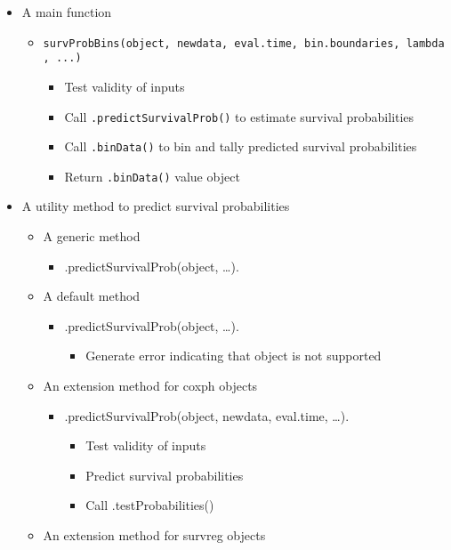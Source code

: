 \documentclass[
]{book}
\providecommand{\tightlist}{%
  \setlength{\itemsep}{0pt}\setlength{\parskip}{0pt}}
\begin{document}
\begin{itemize}
\tightlist
\item
  A main function

  \begin{itemize}
  \tightlist
  \item
    \texttt{survProbBins(object,\ newdata,\ eval.time,\ bin.boundaries,\ lambda,\ ...)}

    \begin{itemize}
    \tightlist
    \item
      Test validity of inputs
    \item
      Call \texttt{.predictSurvivalProb()} to estimate survival probabilities
    \item
      Call \texttt{.binData()} to bin and tally predicted survival probabilities
    \item
      Return \texttt{.binData()} value object
    \end{itemize}
  \end{itemize}
\item
  A utility method to predict survival probabilities

  \begin{itemize}
  \tightlist
  \item
    A generic method

    \begin{itemize}
    \tightlist
    \item
      .predictSurvivalProb(object, \ldots).
    \end{itemize}
  \item
    A default method

    \begin{itemize}
    \tightlist
    \item
      .predictSurvivalProb(object, \ldots).

      \begin{itemize}
      \tightlist
      \item
        Generate error indicating that object is not supported
      \end{itemize}
    \end{itemize}
  \item
    An extension method for coxph objects

    \begin{itemize}
    \tightlist
    \item
      .predictSurvivalProb(object, newdata, eval.time, \ldots).

      \begin{itemize}
      \tightlist
      \item
        Test validity of inputs
      \item
        Predict survival probabilities
      \item
        Call .testProbabilities()
      \end{itemize}
    \end{itemize}
  \item
    An extension method for survreg objects


\end{itemize}
\end{itemize}
\end{document}
